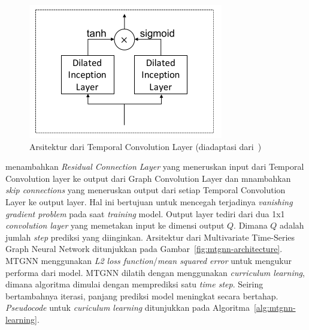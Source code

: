 \begin{figure}[H]
    \centering
    \includegraphics[]{figures/tc_layer.png}
    \caption{Arsitektur dari Temporal Convolution Layer (diadaptasi dari~\cite{Wu2020})}
    \label{fig:tc-layer}
\end{figure}

\cite{Wu2020} menambahkan \textit{Residual Connection Layer} yang meneruskan input dari Temporal Convolution layer ke output dari Graph Convolution Layer dan mnambahkan \textit{skip connections} yang meneruskan output dari setiap Temporal Convolution Layer ke output layer. Hal ini bertujuan untuk mencegah terjadinya \textit{vanishing gradient problem} pada saat \textit{training} model. Output layer tediri dari dua 1x1 \textit{convolution layer} yang memetakan input ke dimensi output $Q$. Dimana $Q$ adalah jumlah \textit{step} prediksi yang diinginkan. Arsitektur dari Multivariate Time-Series Graph Neural Network ditunjukkan pada Gambar~\ref{fig:mtgnn-architecture}. MTGNN menggunakan \textit{L2 loss function}/\textit{mean squared error} untuk mengukur performa dari model. MTGNN dilatih dengan menggunakan \textit{curriculum learning}, dimana algoritma dimulai dengan memprediksi satu \textit{time step}. Seiring bertambahnya iterasi, panjang prediksi model meningkat secara bertahap. \textit{Pseudocode} untuk \textit{curiculum learning} ditunjukkan pada Algoritma~\ref{alg:mtgnn-learning}.


